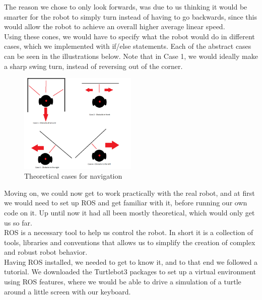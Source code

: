 \documentclass[conference]{IEEEtran}
\begin{document}
The reason we chose to only look forwards, was due to us thinking it would be smarter for the robot
to simply turn instead of having to go backwards, since this would allow the robot to achieve an overall 
higher average linear speed. \\
Using these cones, we would have to specify what the robot would do in different cases, 
which we implemented with if/else statements. Each of the abstract cases can be seen in the illustrations below. 
Note that in Case 1, we would ideally make a sharp swing turn, instead of reversing out of the corner.
\begin{figure}[h] %
    \centering
    \includegraphics[width=0.5\textwidth]{cases.png}
    \caption{Theoretical cases for navigation}
\end{figure} 

Moving on, we could now get to work practically with the real robot, and at first we would need to set up ROS and 
get familiar with it, before running our own code on it. Up until now it had all been mostly theoretical, 
which would only get us so far.\\
ROS is a necessary tool to help us control the robot. In short it is a collection 
of tools, libraries and conventions that allows us to simplify the creation of complex and robust robot behavior.\\
Having ROS installed, we needed to get to know it, and to that end we followed a tutorial. We downloaded the 
Turtlebot3 packages to set up a virtual environment using ROS features, where we would be able to drive a simulation 
of a turtle around a little screen with our keyboard. \\
\end{document}
